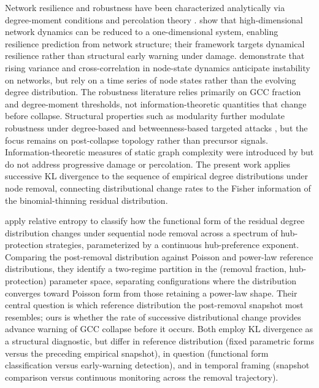 \documentclass{nws}
\begin{document}
Network resilience and robustness have been characterized analytically via degree-moment conditions \citep{molloy1995critical,callaway2000network} and percolation theory \citep{cohen2000resilience}. \citet{gao2016resilience} show that high-dimensional network dynamics can be reduced to a one-dimensional system, enabling resilience prediction from network structure; their framework targets dynamical resilience rather than structural early warning under damage. \citet{suweis2014earlywarning} demonstrate that rising variance and cross-correlation in node-state dynamics anticipate instability on networks, but rely on a time series of node states rather than the evolving degree distribution. The robustness literature \citep{albert2000error,radicchi2024robustness} relies primarily on GCC fraction and degree-moment thresholds, not information-theoretic quantities that change before collapse. Structural properties such as modularity further modulate robustness under degree-based and betweenness-based targeted attacks \citep{bellingeri2021modularity}, but the focus remains on post-collapse topology rather than precursor signals. Information-theoretic measures of static graph complexity were introduced by \citet{dehmer2008information} but do not address progressive damage or percolation. The present work applies successive KL divergence to the sequence of empirical degree distributions under node removal, connecting distributional change rates to the Fisher information of the binomial-thinning residual distribution.

\citet{lee2022degree} apply relative entropy to classify how the functional form of the residual degree distribution changes under sequential node removal across a spectrum of hub-protection strategies, parameterized by a continuous hub-preference exponent. Comparing the post-removal distribution against Poisson and power-law reference distributions, they identify a two-regime partition in the (removal fraction, hub-protection) parameter space, separating configurations where the distribution converges toward Poisson form from those retaining a power-law shape. Their central question is which reference distribution the post-removal snapshot most resembles; ours is whether the rate of successive distributional change provides advance warning of GCC collapse before it occurs. Both employ KL divergence as a structural diagnostic, but differ in reference distribution (fixed parametric forms versus the preceding empirical snapshot), in question (functional form classification versus early-warning detection), and in temporal framing (snapshot comparison versus continuous monitoring across the removal trajectory).
\end{document}
